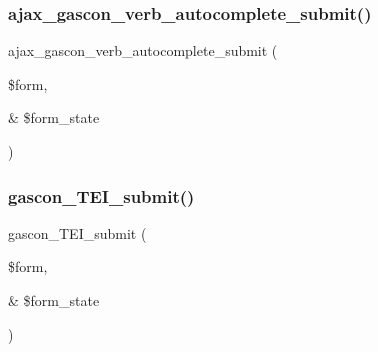 \subsubsection{\texorpdfstring{ajax\+\_\+gascon\+\_\+verb\+\_\+autocomplete\+\_\+submit()}{ajax\_gascon\_verb\_autocomplete\_submit()}}
{\footnotesize\ttfamily ajax\+\_\+gascon\+\_\+verb\+\_\+autocomplete\+\_\+submit (\begin{DoxyParamCaption}\item[{}]{\$form,  }\item[{\&}]{\$form\+\_\+state }\end{DoxyParamCaption})}

\hypertarget{php_2conjoc__gascon__web_form_8inc_aeae9bd30b3fa7e4a9edf10587db73c23}{}\label{php_2conjoc__gascon__web_form_8inc_aeae9bd30b3fa7e4a9edf10587db73c23} 
\subsubsection{\texorpdfstring{gascon\+\_\+\+T\+E\+I\+\_\+submit()}{gascon\_TEI\_submit()}}
{\footnotesize\ttfamily gascon\+\_\+\+T\+E\+I\+\_\+submit (\begin{DoxyParamCaption}\item[{}]{\$form,  }\item[{\&}]{\$form\+\_\+state }\end{DoxyParamCaption})}


